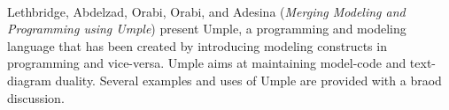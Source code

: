 

\ \hline \ %

Lethbridge, Abdelzad, Orabi, Orabi, and Adesina
\cite{isola-2016-lethbridge}
({\em Merging Modeling and Programming using Umple})
present Umple, a programming and modeling language that has been created by introducing modeling constructs in programming and vice-versa. Umple aims at maintaining model-code and text-diagram duality. Several examples and uses of Umple are provided with a braod discussion.

